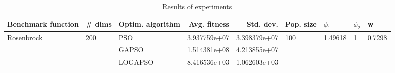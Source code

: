 \begin{table}
\centering
\caption{Results of experiments}
\begin{tabular}{lllrrllll}
\toprule
         Benchmark function &              \# dims & Optim. algorithm &  Avg. fitness &    Std. dev. &            Pop. size &               $\phi_{1}$ &         $\phi_{2}$ &                       w \\
\midrule
\multirow{3}{*}{Rosenbrock} & \multirow{3}{*}{200} &              PSO &  3.937759e+07 & 3.398379e+07 & \multirow{3}{*}{100} & \multirow{3}{*}{1.49618} & \multirow{3}{*}{1} & \multirow{3}{*}{0.7298} \\
                            &                      &            GAPSO &  1.514381e+08 & 4.213855e+07 &                      &                          &                    &                         \\
                            &                      &          LOGAPSO &  8.416536e+03 & 1.062603e+03 &                      &                          &                    &                         \\
\bottomrule
\end{tabular}
\end{table}
